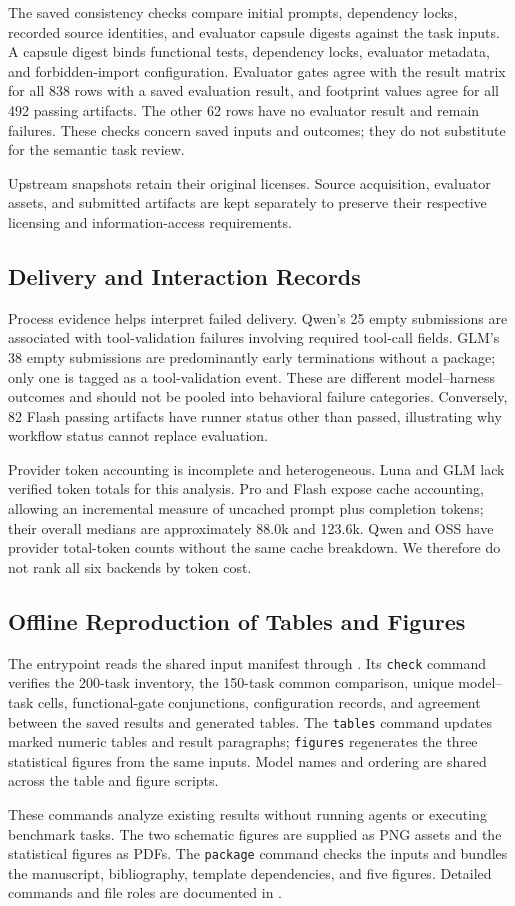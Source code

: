 \documentclass[acmsmall,screen,review,anonymous,nonacm]{acmart}
\begin{document}
The saved consistency checks compare initial prompts, dependency locks,
recorded source identities, and evaluator capsule digests against the task
inputs. A capsule digest binds functional tests, dependency locks, evaluator
metadata, and forbidden-import configuration. Evaluator gates agree with
the result matrix for all 838 rows with a saved evaluation result, and
footprint values agree for all 492 passing artifacts. The other 62 rows have
no evaluator result and remain failures. These checks concern saved inputs
and outcomes; they do not substitute for the semantic task review.

Upstream snapshots retain their original licenses. Source acquisition,
evaluator assets, and submitted artifacts are kept separately to preserve
their respective licensing and information-access requirements.


\subsection{Delivery and Interaction Records}

Process evidence helps interpret failed delivery. Qwen's 25 empty
submissions are associated with tool-validation failures involving required
tool-call fields. GLM's 38 empty submissions are predominantly early terminations
without a package; only one is tagged as a tool-validation event. These are
different model--harness outcomes and should not be pooled into behavioral
failure categories. Conversely, 82 Flash passing artifacts have runner status
other than passed, illustrating why workflow status cannot replace evaluation.

Provider token accounting is incomplete and heterogeneous. Luna and GLM lack
verified token totals for this analysis. Pro and Flash expose cache accounting,
allowing an incremental measure of uncached prompt plus completion tokens;
their overall medians are approximately 88.0k and 123.6k. Qwen and OSS have
provider total-token counts without the same cache breakdown. We therefore
do not rank all six backends by token cost.

\subsection{Offline Reproduction of Tables and Figures}
The entrypoint  reads the shared input manifest through
. Its \texttt{check} command verifies the
200-task inventory, the 150-task common comparison, unique model--task cells,
functional-gate conjunctions, configuration records, and agreement between
the saved results and generated tables. The \texttt{tables} command updates
marked numeric tables and result paragraphs; \texttt{figures} regenerates the
three statistical figures from the same inputs. Model names and ordering are
shared across the table and figure scripts.

These commands analyze existing results without running agents or executing
benchmark tasks. The two schematic figures are supplied as PNG assets and
the statistical figures as PDFs. The \texttt{package} command checks the
inputs and bundles the manuscript, bibliography, template dependencies, and
five figures. Detailed commands and file roles are documented in
.
\end{document}

